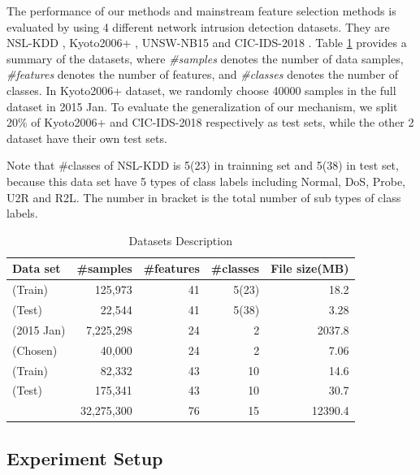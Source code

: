 \documentclass{ieeeaccess}
\theoremstyle{definition}
\begin{document}
The performance of our methods and mainstream feature selection methods is evaluated by using 4 different network intrusion detection datasets. They are NSL-KDD \cite{nsl-kdd}, Kyoto2006+ \cite{kyoto2006}, UNSW-NB15 \cite{UNSWNB2015} and CIC-IDS-2018 \cite{CIC-IDS-2018}. 
Table \ref{tab:datasets} provides a summary of the datasets, where \emph{\#samples} denotes the number of data samples, \emph{\#features} denotes the number of features, and \emph{\#classes} denotes the number of classes. 
In Kyoto2006+ dataset, we randomly choose 40000 samples in the full dataset in 2015 Jan. 
To evaluate the generalization of our mechanism, we split 20\% of Kyoto2006+ and CIC-IDS-2018 respectively as test sets, while the other 2 dataset have their own test sets.

Note that \#classes of NSL-KDD is 5(23) in trainning set and 5(38) in test set, because this data set have 5 types of class labels including Normal, DoS, Probe, U2R and R2L. The number in bracket is the total number of sub types of class labels.

\begin{table}[!htbp]
    \centering
    \caption{Datasets Description}
        \begin{tabular}{lrrrr}
        \toprule
        Data set                    & \#samples & \#features & \#classes & File size(MB) \\
        \midrule
        \cite{nsl-kdd}(Train)            & 125,973    & 41    & 5(23) & 18.2      \\
        \cite{nsl-kdd}(Test)                           & 22,544     & 41    & 5(38) & 3.28      \\
        \cite{kyoto2006}(2015 Jan)    & 7,225,298   & 24    & 2     & 2037.8    \\
        \cite{kyoto2006}(Chosen)             & 40,000     & 24    & 2     & 7.06      \\
        \cite{UNSWNB2015}(Train)       & 82,332     & 43    & 10    & 14.6      \\
        \cite{UNSWNB2015}(Test)                         & 175,341    & 43    & 10    & 30.7      \\
        \cite{CIC-IDS-2018}         & 32,275,300  & 76    & 15    & 12390.4   \\
        \bottomrule
        \end{tabular}%
    \label{tab:datasets}%
\end{table}%

\subsection{Experiment Setup}
\end{document}
